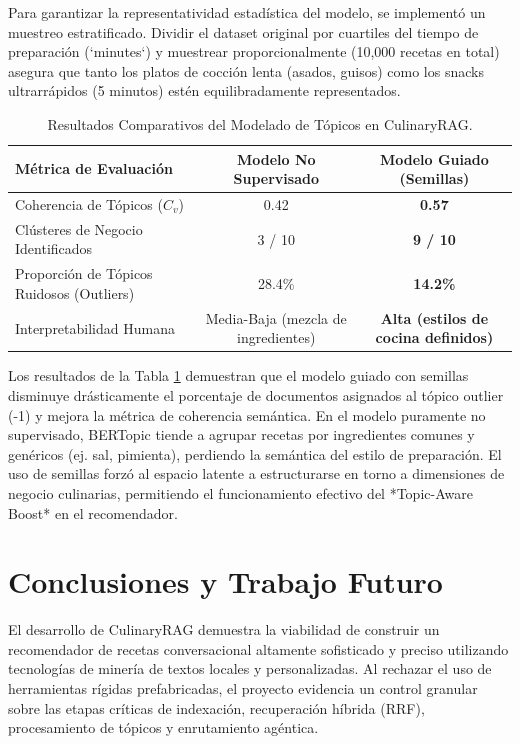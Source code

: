 \documentclass[11pt,a4paper]{article}
\begin{document}
Para garantizar la representatividad estadística del modelo, se implementó un muestreo estratificado. Dividir el dataset original por cuartiles del tiempo de preparación (`minutes`) y muestrear proporcionalmente (10,000 recetas en total) asegura que tanto los platos de cocción lenta (asados, guisos) como los snacks ultrarrápidos (5 minutos) estén equilibradamente representados.

\begin{table}[h]
\centering
\begin{tabular}{lcc}
\toprule
\textbf{Métrica de Evaluación} & \textbf{Modelo No Supervisado} & \textbf{Modelo Guiado (Semillas)} \\
\midrule
Coherencia de Tópicos ($C_v$) & 0.42 & \textbf{0.57} \\
Clústeres de Negocio Identificados & 3 / 10 & \textbf{9 / 10} \\
Proporción de Tópicos Ruidosos (Outliers) & 28.4\% & \textbf{14.2\%} \\
Interpretabilidad Humana & Media-Baja (mezcla de ingredientes) & \textbf{Alta (estilos de cocina definidos)} \\
\bottomrule
\end{tabular}
\caption{Resultados Comparativos del Modelado de Tópicos en CulinaryRAG.}
\label{tab:experimento}
\end{table}

Los resultados de la Tabla \ref{tab:experimento} demuestran que el modelo guiado con semillas disminuye drásticamente el porcentaje de documentos asignados al tópico outlier (-1) y mejora la métrica de coherencia semántica. En el modelo puramente no supervisado, BERTopic tiende a agrupar recetas por ingredientes comunes y genéricos (ej. sal, pimienta), perdiendo la semántica del estilo de preparación. El uso de semillas forzó al espacio latente a estructurarse en torno a dimensiones de negocio culinarias, permitiendo el funcionamiento efectivo del *Topic-Aware Boost* en el recomendador.


\section{Conclusiones y Trabajo Futuro}

El desarrollo de CulinaryRAG demuestra la viabilidad de construir un recomendador de recetas conversacional altamente sofisticado y preciso utilizando tecnologías de minería de textos locales y personalizadas. Al rechazar el uso de herramientas rígidas prefabricadas, el proyecto evidencia un control granular sobre las etapas críticas de indexación, recuperación híbrida (RRF), procesamiento de tópicos y enrutamiento agéntica.
\end{document}

